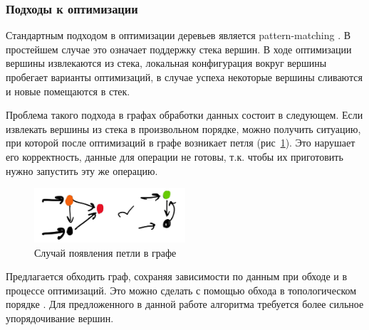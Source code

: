 \subsubsection{Подходы к оптимизации}

Стандартным подходом в оптимизации деревьев является pattern-matching \cite{pattern}. В простейшем случае это означает поддержку стека вершин. В ходе оптимизации вершины извлекаются из стека, локальная конфигурация вокруг вершины пробегает варианты оптимизаций, в случае успеха некоторые вершины сливаются и новые помещаются в стек.

Проблема такого подхода в графах обработки данных состоит в следующем. Если извлекать вершины из стека в произвольном порядке, можно получить ситуацию, при которой после оптимизаций в графе возникает петля (рис~\ref{fig:loop}). Это нарушает его корректность, данные для операции не готовы, т.к. чтобы их приготовить нужно запустить эту же операцию.

\begin{figure}[h]
    \centering
    \includegraphics[width=0.5\textwidth]{img/loop.jpeg}
    \caption{Случай появления петли в графе}
    \label{fig:loop}
\end{figure}

Предлагается обходить граф, сохраняя зависимости по данным при обходе и в процессе оптимизаций. Это можно сделать с помощью обхода в топологическом порядке \cite{flume}. Для предложенного в данной работе алгоритма требуется более сильное упорядочивание вершин.
